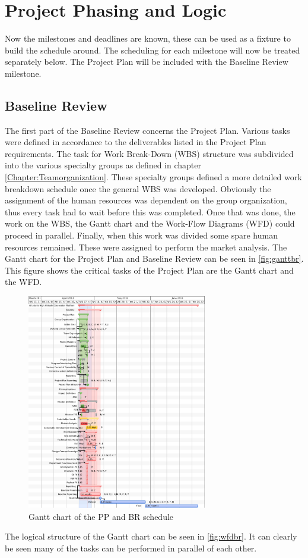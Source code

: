 \documentclass[a4paper]{report}
\begin{document}
\section{Project Phasing and Logic}
Now the milestones and deadlines are known, these can be used as a fixture to build the schedule around. The scheduling for each milestone will now be treated separately below. The Project Plan will be included with the Baseline Review milestone. 
\subsection{Baseline Review}
The first part of the Baseline Review concerns the Project Plan. Various tasks were defined in accordance to the deliverables listed in the Project Plan requirements. The task for Work Break-Down (WBS) structure was subdivided into the various specialty groups as defined in chapter \ref{Chapter:Teamorganization}. These specialty groups defined a more detailed work breakdown schedule once the general WBS was developed. Obviously the assignment of the human resources was dependent on the group organization, thus every task had to wait before this was completed. Once that was done, the work on the WBS, the Gantt chart and the Work-Flow Diagrams (WFD) could proceed in parallel. Finally, when this work was divided some spare human resources remained. These were assigned to perform the market analysis. \newline
\noindent
The Gantt chart for the Project Plan and Baseline Review can be seen in \autoref{fig:ganttbr}. This figure shows the critical tasks of the Project Plan are the Gantt chart and the WFD.
\begin{figure}[h]
	\centering
	
	\includegraphics[width=0.7\textwidth]{Figures/BASEGANTT.PDF}
	\caption{Gantt chart of the PP and BR schedule}
	\label{fig:ganttbr}
	
\end{figure}
The logical structure of the Gantt chart can be seen in \autoref{fig:wfdbr}. It can clearly be seen many of the tasks can be performed in parallel of each other. 
\end{document}
